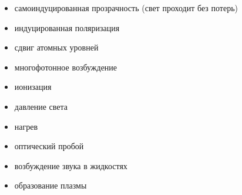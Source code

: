 
\begin{itemize}
	\item самоиндуцированная прозрачность (свет проходит без потерь) 
	\item индуцированная поляризация
	\item сдвиг атомных уровней
	\item многофотонное возбуждение
	\item ионизация
	\item давление света
	\item нагрев
	\item оптический пробой
	\item возбуждение звука в жидкостях
	\item образование плазмы
\end{itemize}
